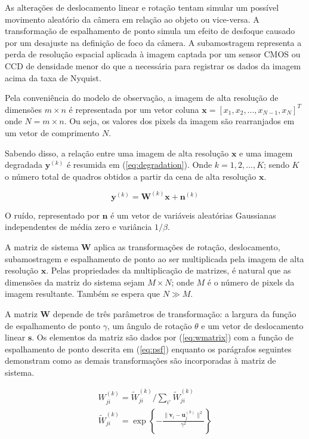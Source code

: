 As alterações de deslocamento linear e rotação tentam simular um possível movimento
aleatório da câmera em relação ao objeto ou vice-versa.
A transformação de espalhamento de ponto simula um efeito de desfoque causado por um
desajuste na definição de foco da câmera.
A subamostragem representa a perda de resolução espacial aplicada à imagem captada
por um sensor CMOS ou CCD de densidade menor do que a necessária para registrar os dados da imagem acima da taxa de Nyquist.

Pela conveniência do modelo de observação, a imagem de alta resolução de dimensões $m \times n$ é representada por um vetor coluna $\mathbf{x} = [x_1, x_2, ... , x_{N-1}, x_N]^T$ onde $N ={} m \times n$. Ou seja, os valores dos pixels da imagem são rearranjados em um vetor de comprimento $N$.

Sabendo disso, a relação entre uma imagem de alta resolução $\mathbf{x}$ e uma imagem degradada $\mathbf{y}^{(k)}$ é resumida em (\ref{eq:degradation}). Onde $k = 1,2,...,K$; sendo $K$ o número total de quadros obtidos a partir da cena de alta resolução $\mathbf{x}$.

\begin{equation}
	\label{eq:degradation}
	\mathbf{y}^{(k)} = \mathbf{W}^{(k)}\mathbf{x} + \mathbf{n}^{(k)}
\end{equation}

O ruído, representado por $\mathbf{n}$ é um vetor de variáveis aleatórias Gaussianas independentes de média zero e variância $1/\beta$.

A matriz de sistema $\mathbf{W}$ aplica as transformações de rotação, deslocamento, subamostragem e espalhamento de ponto ao ser multiplicada pela imagem de alta resolução $\mathbf{x}$.
Pelas propriedades da multiplicação de matrizes, é natural que as dimensões da matriz do sistema sejam $M \times N$; onde $M$ é o número de pixels da imagem resultante.
Também se espera que $N \gg M$.

A matriz $\mathbf{W}$ depende de três parâmetros de transformação: a largura da função de espalhamento de ponto $\gamma$, um ângulo de rotação $\theta$ e um vetor de deslocamento linear $\mathbf{s}$.
Os elementos da matriz são dados por (\ref{eq:wmatrix}) com a função de espalhamento de ponto descrita em (\ref{eq:psf}) enquanto os parágrafos seguintes demonstram como as demais transformações são incorporadas à matriz de sistema.

\begin{gather}
	\label{eq:wmatrix}
	W^{(k)}_{ji} = \widetilde{W}^{(k)}_{ji} / \sum_{i'} \widetilde{W}^{(k)}_{ji} \\
	\label{eq:psf}
	\widetilde{W}^{(k)}_{ji} = \exp \left\{- \frac{\|\mathbf{v}_i - \mathbf{u}^{(k)}_j\|^2}{\gamma^2} \right\}
\end{gather}

